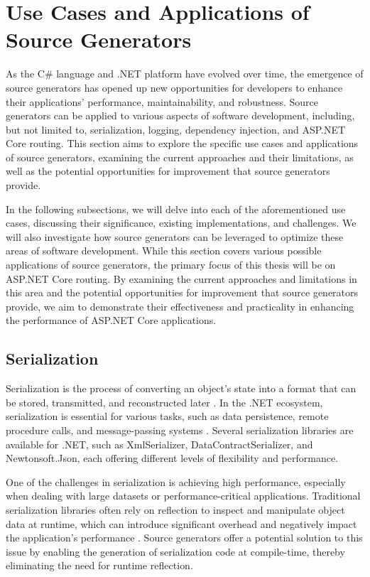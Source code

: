 \section{Use Cases and Applications of Source Generators}

As the C\# language and .NET platform have evolved over time, the emergence of source generators has opened up new opportunities for developers to enhance their applications' performance, maintainability, and robustness. Source generators can be applied to various aspects of software development, including, but not limited to, serialization, logging, dependency injection, and ASP.NET Core routing. This section aims to explore the specific use cases and applications of source generators, examining the current approaches and their limitations, as well as the potential opportunities for improvement that source generators provide.

In the following subsections, we will delve into each of the aforementioned use cases, discussing their significance, existing implementations, and challenges. We will also investigate how source generators can be leveraged to optimize these areas of software development. While this section covers various possible applications of source generators, the primary focus of this thesis will be on ASP.NET Core routing. By examining the current approaches and limitations in this area and the potential opportunities for improvement that source generators provide, we aim to demonstrate their effectiveness and practicality in enhancing the performance of ASP.NET Core applications.

\subsection{Serialization}

Serialization is the process of converting an object's state into a format that can be stored, transmitted, and reconstructed later \cite{Fowler2002}. In the .NET ecosystem, serialization is essential for various tasks, such as data persistence, remote procedure calls, and message-passing systems \cite{Fowler2002}. Several serialization libraries are available for .NET, such as XmlSerializer, DataContractSerializer, and Newtonsoft.Json, each offering different levels of flexibility and performance.

One of the challenges in serialization is achieving high performance, especially when dealing with large datasets or performance-critical applications. Traditional serialization libraries often rely on reflection to inspect and manipulate object data at runtime, which can introduce significant overhead and negatively impact the application's performance \cite{NewtonsoftJsonPerformance}. Source generators offer a potential solution to this issue by enabling the generation of serialization code at compile-time, thereby eliminating the need for runtime reflection.

